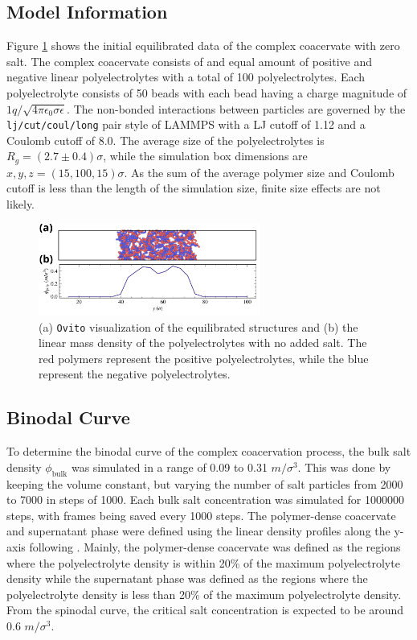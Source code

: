 \documentclass[10pt,a4paper]{labreport}
\begin{document}
\subsection{Model Information}
Figure \ref{fig:ass4_equlib} shows the initial equilibrated data of the complex coacervate with zero salt. 
The complex coacervate consists of and equal amount of positive and negative linear polyelectrolytes with a total of 100 polyelectrolytes. Each polyelectrolyte consists of 50 beads with each bead having a charge magnitude of $1q/\sqrt{4\pi\epsilon_0\sigma\epsilon}$. The non-bonded interactions between particles are governed by the \texttt{lj/cut/coul/long} pair style of LAMMPS with a LJ cutoff of 1.12 and a Coulomb cutoff of 8.0. The average size of the polyelectrolytes is $R_g = (2.7 \pm 0.4) \sigma$, while the simulation box dimensions are $x, y, z = (15, 100, 15) \sigma$. As the sum of the average polymer size and Coulomb cutoff is less than the length of the simulation size, finite size effects are not likely. 
\begin{figure}[h]
  \centering  
  \includegraphics[width = 0.65\textwidth]{figs/ass4_equilib.png}
  \caption{(a) \texttt{Ovito} visualization of the equilibrated structures and (b) the linear mass density of the polyelectrolytes with no added salt. The red polymers represent the positive polyelectrolytes, while the blue represent the negative polyelectrolytes.}
  \label{fig:ass4_equlib}
\end{figure}

\subsection{Binodal Curve}
To determine the binodal curve of the complex coacervation process, the bulk salt density $\phi_\text{bulk}$ was simulated in a range of 0.09 to 0.31 $m/\sigma^3$. This was done by keeping the volume constant, but varying the number of salt particles from 2000 to 7000 in steps of 1000. Each bulk salt concentration was simulated for 1000000 steps, with frames being saved every 1000 steps.  The polymer-dense coacervate and supernatant phase were defined using the linear density profiles along the  y-axis following \cite{Nayan}. Mainly, the polymer-dense coacervate was defined as the regions where the polyelectrolyte density is within 20\% of the maximum polyelectrolyte density while the supernatant phase was defined as the regions where the polyelectrolyte density is less than 20\% of the maximum  polyelectrolyte density.  From the spinodal curve, the critical salt concentration is expected to be around 0.6 $m/\sigma^3$. 
\end{document}
